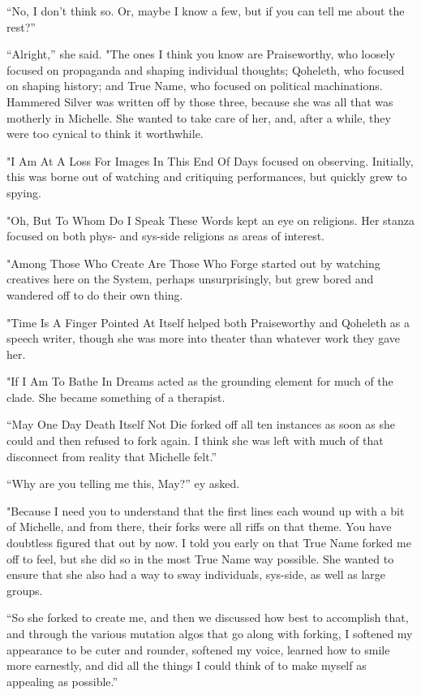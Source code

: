 ``No, I don't think so. Or, maybe I know a few, but if you can tell me about the rest?''

``Alright,'' she said. "The ones I think you know are Praiseworthy, who loosely focused on propaganda and shaping individual thoughts; Qoheleth, who focused on shaping history; and True Name, who focused on political machinations. Hammered Silver was written off by those three, because she was all that was motherly in Michelle. She wanted to take care of her, and, after a while, they were too cynical to think it worthwhile.

"I Am At A Loss For Images In This End Of Days focused on observing. Initially, this was borne out of watching and critiquing performances, but quickly grew to spying.

"Oh, But To Whom Do I Speak These Words kept an eye on religions. Her stanza focused on both phys- and sys-side religions as areas of interest.

"Among Those Who Create Are Those Who Forge started out by watching creatives here on the System, perhaps unsurprisingly, but grew bored and wandered off to do their own thing.

"Time Is A Finger Pointed At Itself helped both Praiseworthy and Qoheleth as a speech writer, though she was more into theater than whatever work they gave her.

"If I Am To Bathe In Dreams acted as the grounding element for much of the clade. She became something of a therapist.

``May One Day Death Itself Not Die forked off all ten instances as soon as she could and then refused to fork again. I think she was left with much of that disconnect from reality that Michelle felt.''

``Why are you telling me this, May?'' ey asked.

"Because I need you to understand that the first lines each wound up with a bit of Michelle, and from there, their forks were all riffs on that theme. You have doubtless figured that out by now. I told you early on that True Name forked me off to feel, but she did so in the most True Name way possible. She wanted to ensure that she also had a way to sway individuals, sys-side, as well as large groups.

``So she forked to create me, and then we discussed how best to accomplish that, and through the various mutation algos that go along with forking, I softened my appearance to be cuter and rounder, softened my voice, learned how to smile more earnestly, and did all the things I could think of to make myself as appealing as possible.''

